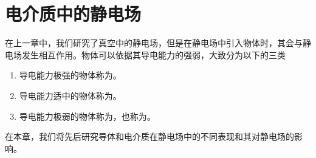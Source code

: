 \chapter{电介质中的静电场}
在上一章中，我们研究了真空中的静电场，但是在静电场中引入物体时，其会与静电场发生相互作用。物体可以依据其导电能力的强弱，大致分为以下的三类
\begin{enumerate}
    \item 导电能力极强的物体称为。
    \item 导电能力适中的物体称为。
    \item 导电能力极弱的物体称为，也称为。
\end{enumerate}
在本章，我们将先后研究导体和电介质在静电场中的不同表现和其对静电场的影响。





